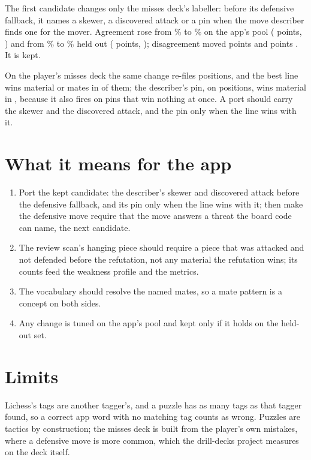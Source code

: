 \documentclass[11pt]{article}
\begin{document}
The first candidate changes only the misses deck's labeller: before its defensive fallback, it
names a skewer, a discovered attack or a pin when the move describer finds one for the mover.
Agreement rose from \CandAppAgreeBase\% to \CandAppAgree\% on the app's pool (\CandAppAgreeDiff{}
points, \CandAppAgreeCi) and from \CandHeldAgreeBase\% to \CandHeldAgree\% held out
(\CandHeldAgreeDiff{} points, \CandHeldAgreeCi); disagreement moved \CandAppDisDiff{} points
\CandAppDisCi{} and \CandHeldDisDiff{} points \CandHeldDisCi. It is kept.

On the player's misses deck the same change re-files \DeckMoved{} positions, and the best line
wins material or mates in \DeckMovedFit{} of them; the describer's pin, on \DeckPins{} positions,
wins material in \DeckPinsFit, because it also fires on pins that win nothing at once. A port
should carry the skewer and the discovered attack, and the pin only when the line wins with it.

\section{What it means for the app}

\begin{enumerate}[nosep]
\item Port the kept candidate: the describer's skewer and discovered attack before the
defensive fallback, and its pin only when the line wins with it; then make the defensive move
require that the move answers a threat the board code can name, the next candidate.
\item The review scan's hanging piece should require a piece that was attacked and not
defended before the refutation, not any material the refutation wins; its counts feed the
weakness profile and the metrics.
\item The vocabulary should resolve the named mates, so a mate pattern is a concept on both
sides.
\item Any change is tuned on the app's pool and kept only if it holds on the held-out set.
\end{enumerate}

\section{Limits}

Lichess's tags are another tagger's, and a puzzle has as many tags as that tagger found, so a
correct app word with no matching tag counts as wrong. Puzzles are tactics by construction; the
misses deck is built from the player's own mistakes, where a defensive move is more common, which
the drill-decks project measures on the deck itself.
\end{document}
